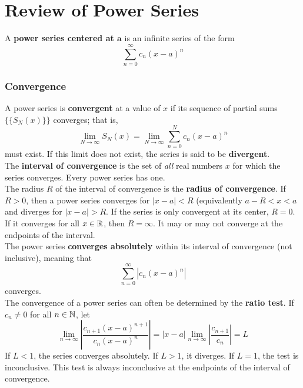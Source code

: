 \documentclass[./Differential Equations.tex]{subfiles}
\begin{document}
	\section{Review of Power Series}
			A \textbf{power series centered at \(\bm{a}\)} is an infinite series of the form
				\[\sum_{n = 0}^\infty c_n(x - a)^n\]
			\subsubsection*{Convergence}
				A power series is \textbf{convergent} at a value of \(x\) if its sequence of partial sums \(\{\{S_N(x)\}\}\) converges; that is,
					\[\lim_{N \to \infty}S_N(x) = \lim_{N \to \infty}\sum_{n = 0}^Nc_n(x - a)^n\]
					must exist. If this limit does not exist, the series is said to be \textbf{divergent}. \\
				 The \textbf{interval of convergence} is the set of \textit{all} real numbers \(x\) for which the series converges. Every power series has one. \\
				 The radius \(R\) of the interval of convergence is the \textbf{radius of convergence}. If \(R > 0\), then a power series converges for \(|x - a| < R\) (equivalently \(a - R < x < a\)  and diverges for \(|x - a| > R\). If the series is only convergent at its center, \(R = 0\). If it converges for all \(x \in \mathbb{R}\), then \(R = \infty\). It may or may not converge at the endpoints of the interval. \\
				 The power series \textbf{converges absolutely} within its interval of convergence (not inclusive), meaning that
				 	\[\sum_{n = 0}^\infty\left|c_n(x - a)^n\right|\]
				 	converges. \\
				 The convergence of a power series can often be determined by the \textbf{ratio test}. If \(c_n \ne 0\) for all \(n \in \mathbb{N}\), let
				 	\[
				 		\lim_{n \to \infty}\left|\frac{c_{n + 1}(x - a)^{n + 1}}{c_n(x - a)^n}\right|
				 			= |x - a|\lim_{n \to \infty}\left|\frac{c_{n + 1}}{c_n}\right|
				 			= L
					\]
					If \(L < 1\), the series converges absolutely. If \(L > 1\), it diverges. If \(L = 1\), the test is inconclusive. This test is always inconclusive at the endpoints of the interval of convergence.
\end{document}
